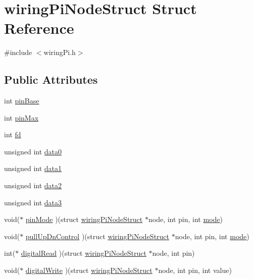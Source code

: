 \hypertarget{structwiringPiNodeStruct}{\section{wiring\-Pi\-Node\-Struct Struct Reference}
\label{structwiringPiNodeStruct}
}


{\ttfamily \#include $<$wiring\-Pi.\-h$>$}

\subsection*{Public Attributes}
\begin{DoxyCompactItemize}
\item 
int \hyperlink{structwiringPiNodeStruct_a46172e5221f43279c33fe1501bb82464}{pin\-Base}
\item 
int \hyperlink{structwiringPiNodeStruct_aa3ca7fa9e518341e54d891a5ba4cd1db}{pin\-Max}
\item 
int \hyperlink{structwiringPiNodeStruct_a0f899d3236fdd2d3d152424a23756c0c}{fd}
\item 
unsigned int \hyperlink{structwiringPiNodeStruct_a952b9e382a7031f1233a34ddb4d2e36b}{data0}
\item 
unsigned int \hyperlink{structwiringPiNodeStruct_abde80f77b7c6c1178904c8748df379ad}{data1}
\item 
unsigned int \hyperlink{structwiringPiNodeStruct_a36c1511632f3ac1bf12f55c0449662a7}{data2}
\item 
unsigned int \hyperlink{structwiringPiNodeStruct_af6759d08711ba10aa16361ea81cd9e1a}{data3}
\item 
void($\ast$ \hyperlink{structwiringPiNodeStruct_a7aa4cd39c2aa600e88897712f1ec710f}{pin\-Mode} )(struct \hyperlink{structwiringPiNodeStruct}{wiring\-Pi\-Node\-Struct} $\ast$node, int pin, int \hyperlink{USBtxEx_8ino_a1ea5d0cb93f22f7d0fdf804bd68c3326}{mode})
\item 
void($\ast$ \hyperlink{structwiringPiNodeStruct_a23c17c9318ce3169990ed0c043b99dbc}{pull\-Up\-Dn\-Control} )(struct \hyperlink{structwiringPiNodeStruct}{wiring\-Pi\-Node\-Struct} $\ast$node, int pin, int \hyperlink{USBtxEx_8ino_a1ea5d0cb93f22f7d0fdf804bd68c3326}{mode})
\item 
int($\ast$ \hyperlink{structwiringPiNodeStruct_adac881fe2056b0e5b2bf1f9a866314fc}{digital\-Read} )(struct \hyperlink{structwiringPiNodeStruct}{wiring\-Pi\-Node\-Struct} $\ast$node, int pin)
\item 
void($\ast$ \hyperlink{structwiringPiNodeStruct_a73f8506846d80ea5e96f98cb14d3d9ef}{digital\-Write} )(struct \hyperlink{structwiringPiNodeStruct}{wiring\-Pi\-Node\-Struct} $\ast$node, int pin, int value)

\end{DoxyCompactItemize}
